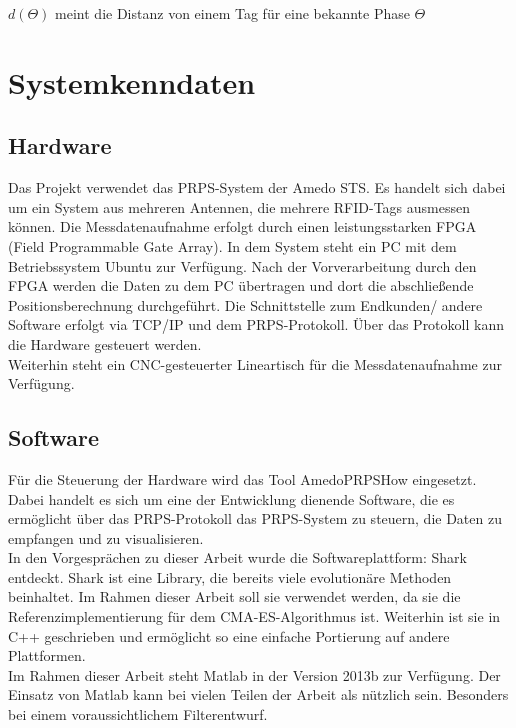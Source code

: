 \documentclass[a4paper,12pt,fleqn]{article}
\begin{document}
$d(\Theta)$ meint die Distanz von einem Tag für eine bekannte Phase $\Theta$
       



\section{Systemkenndaten}
\subsection{Hardware}
Das Projekt verwendet das PRPS-System der Amedo STS. Es handelt sich dabei um ein System aus mehreren Antennen, die mehrere RFID-Tags ausmessen können. Die Messdatenaufnahme erfolgt durch einen leistungsstarken FPGA (Field Programmable Gate Array). In dem System steht ein PC mit dem Betriebssystem Ubuntu zur Verfügung. Nach der Vorverarbeitung durch den FPGA werden die Daten zu dem PC übertragen und dort die abschließende Positionsberechnung durchgeführt. Die Schnittstelle zum Endkunden/ andere Software erfolgt via TCP/IP und dem PRPS-Protokoll. Über das Protokoll kann die Hardware gesteuert werden.\\
Weiterhin steht ein CNC-gesteuerter Lineartisch für die Messdatenaufnahme zur Verfügung.


\subsection{Software}
Für die Steuerung der Hardware wird das Tool AmedoPRPSHow eingesetzt. Dabei handelt es sich um eine der Entwicklung dienende Software, die es ermöglicht über das PRPS-Protokoll das PRPS-System zu steuern, die Daten zu empfangen und zu visualisieren.\\
In den Vorgesprächen zu dieser Arbeit wurde die Softwareplattform: Shark entdeckt. Shark ist eine Library, die bereits viele evolutionäre Methoden beinhaltet. Im Rahmen dieser Arbeit soll sie verwendet werden, da sie die Referenzimplementierung für dem CMA-ES-Algorithmus ist. Weiterhin ist sie in C++ geschrieben und ermöglicht so eine einfache Portierung auf andere Plattformen.\\
Im Rahmen dieser Arbeit steht Matlab in der Version 2013b zur Verfügung. Der Einsatz von Matlab kann bei vielen Teilen der Arbeit als nützlich sein. Besonders bei einem voraussichtlichem Filterentwurf.  
\end{document}

